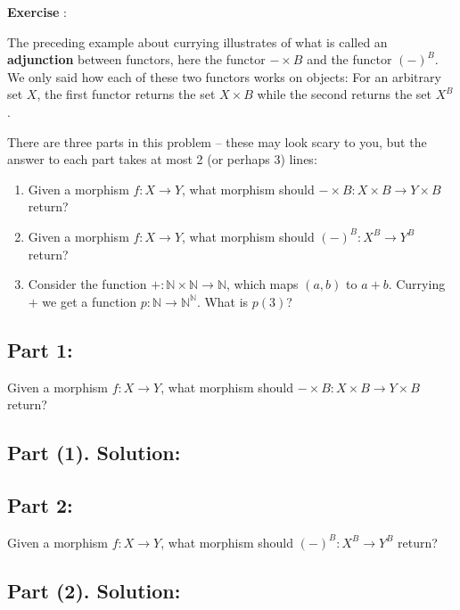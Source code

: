 \documentclass{article}
\begin{document}
\begin{mdframed}
    \textbf{Exercise }:
    
    \vspace{1em}
The preceding example about currying illustrates of what is called an \textbf{adjunction} between functors, here the functor $- \times B$ and the functor $(-)^B$. We only said how each of these two functors works on objects: For an arbitrary set $X$, the first functor returns the set $X \times B$ while the second returns the set $X^B$.

There are three parts in this problem -- these may look scary to you, but the answer to each part takes at most 2 (or perhaps 3) lines:

\begin{enumerate}
    \item Given a morphism $f : X \to Y$, what morphism should $- \times B : X \times B \to Y \times B$ return?
    
    \vspace{1em}
    \item Given a morphism $f : X \to Y$, what morphism should $(-)^B : X^B \to Y^B$ return?
    
    \vspace{1em}
    \item Consider the function $+ : \mathbb{N} \times \mathbb{N} \to \mathbb{N}$, which maps $(a,b)$ to $a + b$. Currying $+$ we get a function $p : \mathbb{N} \to \mathbb{N}^{\mathbb{N}}$. What is $p(3)$?
\end{enumerate}
\end{mdframed}
    

 \subsection*{Part 1:  } 
 Given a morphism $f : X \to Y$, what morphism should $- \times B : X \times B \to Y \times B$ return? 
 \subsection*{Part (1). Solution:}


 \newpage

 \subsection*{Part 2:  } 
 Given a morphism $f : X \to Y$, what morphism should $(-)^B : X^B \to Y^B$ return?
  \subsection*{Part (2). Solution:}
\end{document}
